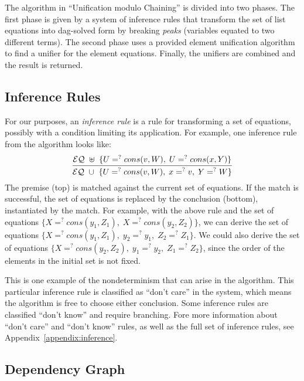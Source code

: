 \documentclass[11pt]{article}
\newcommand{\ueq}{=_{}^?}
\newcommand{\EQ}{\mathcal{EQ}}
\begin{document}
The algorithm in ``Unification modulo Chaining'' is divided into two phases.
The first phase is given by a system of inference rules that transform the
set of list equations into dag-solved form by breaking \emph{peaks} (variables
equated to two different terms). The second phase uses a provided
element unification algorithm to find a unifier for the element equations.
Finally, the unifiers are combined and the result is returned.

\subsection{Inference Rules}\label{subsection:inference}

For our purposes, an \emph{inference rule} is a rule for transforming a set of
equations, possibly with a condition limiting its application. For example, one
inference rule from the algorithm looks like:
\[\infer
    {\EQ ~ \cup ~ \{ U \ueq cons(v, W), \; x \ueq v, \; Y \ueq W \}}
    {\EQ ~ \uplus ~ \{ U \ueq cons(v, W), \; U \ueq cons(x, Y) \}}
\]
The premise (top) is matched against the current set of equations. If
the match is successful, the set of equations is replaced by the conclusion
(bottom), instantiated by the match. For example, with the above rule and
the set of equations $\{ X \ueq cons(y_1, Z_1), \; X \ueq cons(y_2, Z_2) \}$,
we can derive the set of equations $\{ X \ueq cons(y_1, Z_1), \; y_2 \ueq y_1,
\; Z_2 \ueq Z_1 \}$. We could also derive the set of equations $\{ X \ueq
cons(y_2, Z_2), \; y_1 \ueq y_2, \; Z_1 \ueq Z_2 \}$, since the order of the
elements in the initial set is not fixed.

This is one example of the nondeterminism that can arise in the algorithm.
This particular inference rule is classified as ``don't care'' in the system,
which means the algorithm is free to choose either conclusion. Some inference
rules are classified ``don't know'' and require branching. Fore more information
about ``don't care'' and ``don't know'' rules, as well as the full set of inference
rules, see Appendix~\ref{appendix:inference}.

\subsection{Dependency Graph}\label{subsection:graph}
\end{document}
